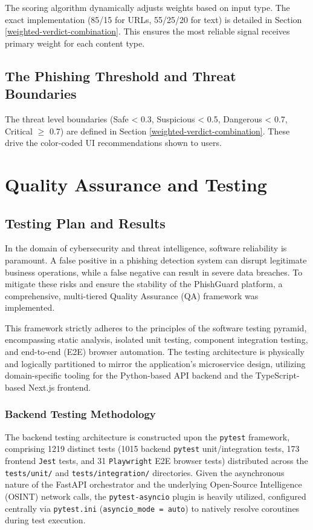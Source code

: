 The scoring algorithm dynamically adjusts weights based on input type. The exact implementation (85/15 for URLs, 55/25/20 for text) is detailed in Section \ref{weighted-verdict-combination}. This ensures the most reliable signal receives primary weight for each content type.

\subsection{The Phishing Threshold and Threat
Boundaries}\label{the-phishing-threshold-and-threat-boundaries}

The threat level boundaries (Safe < 0.3, Suspicious < 0.5, Dangerous < 0.7, Critical $\geq$ 0.7) are defined in Section \ref{weighted-verdict-combination}. These drive the color-coded UI recommendations shown to users.

\section{Quality Assurance and Testing}

\subsection{Testing Plan and Results}

In the domain of cybersecurity and threat intelligence, software
reliability is paramount. A false positive in a phishing detection
system can disrupt legitimate business operations, while a false
negative can result in severe data breaches. To mitigate these risks and
ensure the stability of the PhishGuard platform, a comprehensive,
multi-tiered Quality Assurance (QA) framework was implemented.

This framework strictly adheres to the principles of the software
testing pyramid, encompassing static analysis, isolated unit testing,
component integration testing, and end-to-end (E2E) browser automation.
The testing architecture is physically and logically partitioned to
mirror the application's microservice design, utilizing domain-specific
tooling for the Python-based API backend and the TypeScript-based
Next.js frontend.

\subsubsection{Backend Testing
Methodology}\label{backend-testing-methodology}

The backend testing architecture is constructed upon the \texttt{pytest}
framework, comprising 1219 distinct tests (1015 backend \texttt{pytest} unit/integration tests, 173 frontend \texttt{Jest} tests, and 31 \texttt{Playwright} E2E browser tests) distributed
across the \texttt{tests/unit/} and \texttt{tests/integration/}
directories. Given the asynchronous nature of the FastAPI orchestrator
and the underlying Open-Source Intelligence (OSINT) network calls, the
\texttt{pytest-asyncio} plugin is heavily utilized, configured centrally
via \texttt{pytest.ini} (\texttt{asyncio\_mode\ =\ auto}) to natively
resolve coroutines during test execution.

